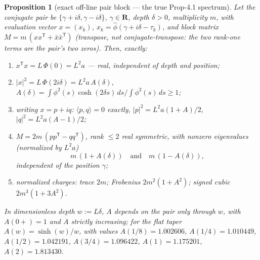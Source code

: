 \documentclass[11pt]{article}
\theoremstyle{plain}
\newtheorem{proposition}[theorem]{Proposition}
\theoremstyle{definition}
\theoremstyle{remark}
\newcommand{\R}{\mathbf{R}}
\newcommand{\ph}{\widehat{\phi}}
\begin{document}
\begin{proposition}[exact off-line pair block --- the true Prop-4.1 spectrum]
\label{prop:pairblock}
Let the conjugate pair be $\{\gamma + i\delta, \gamma - i\delta\}$,
$\gamma \in \R$, depth $\delta > 0$, multiplicity $m$, with evaluation vector
$x = (x_k)$, $x_k = \ph(\gamma + i\delta - \tau_k)$, and block matrix
$M = m\,(x x^{\mathsf{T}} + \bar{x}\bar{x}^{\mathsf{T}})$ (transpose, not
conjugate-transpose: the two rank-one terms are the pair's two zeros). Then,
exactly:
\begin{enumerate}
\item[(i)] $x^{\mathsf{T}} x = L\,\Phi(0) = L^2 a$ --- real, independent of depth
  and position;
\item[(ii)] $|x|^2 = L\,\Phi(2 i \delta) = L^2 a\, A(\delta)$,
  $A(\delta) = \int \phi^2(s) \cosh(2\delta s)\, ds
   \big/ \int \phi^2(s)\, ds \ge 1$;
\item[(iii)] writing $x = p + i q$: $\langle p, q \rangle = 0$ exactly,
  $|p|^2 = L^2 a (1 + A)/2$, $|q|^2 = L^2 a (A - 1)/2$;
\item[(iv)] $M = 2m\,(p p^{\mathsf{T}} - q q^{\mathsf{T}})$, rank $\le 2$ real
  symmetric, with nonzero eigenvalues (normalized by $L^2 a$)
  \[
    m\,(1 + A(\delta)) \quad\text{and}\quad m\,(1 - A(\delta)),
  \]
  independent of the position $\gamma$;
\item[(v)] normalized charges: trace $2m$; Frobenius $2m^2(1 + A^2)$; signed
  cubic $2m^3(1 + 3A^2)$.
\end{enumerate}
In dimensionless depth $w := L\delta$, $A$ depends on the pair only through $w$,
with $A(0+) = 1$ and $A$ strictly increasing; for the flat taper
$A(w) = \sinh(w)/w$, with values $A(1/8) = 1.002606$, $A(1/4) = 1.010449$,
$A(1/2) = 1.042191$, $A(3/4) = 1.096422$, $A(1) = 1.175201$, $A(2) = 1.813430$.
\end{proposition}
\end{document}
